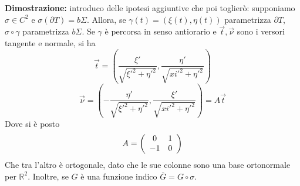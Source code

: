 \documentclass[a4paper,11pt]{article}
\begin{document}
\begin{enumerate}
	\textbf{Dimostrazione:} introduco delle ipotesi aggiuntive che poi toglierò: supponiamo $\sigma\in C^2$ e $\sigma(\partial T)=b\Sigma$. Allora, se $\gamma(t)=(\xi(t),\eta(t))$ parametrizza $\partial T$, $\sigma\circ\gamma$ parametrizza $b\Sigma$. Se $\gamma$ è percorsa in senso antiorario e $\vec{t},\vec\nu$ sono i versori tangente e normale, si ha
	\[\vec{t}=\left(\frac{\xi'}{\sqrt{\xi'^2+\eta'^2}},\frac{\eta'}{\sqrt{xi'^2+\eta'^2}}\right)\]
	\[\vec{\nu}=\left(-\frac{\eta'}{\sqrt{\xi'^2+\eta'^2}},\frac{\xi'}{\sqrt{xi'^2+\eta'^2}}\right)=A\vec{t}\]
	Dove si è posto
	\[A=\left(\begin{array}{c c}
	0 & 1 \\
	-1 & 0 
	\end{array}\right)\]
	Che tra l'altro è ortogonale, dato che le sue colonne sono una base ortonormale per $\mathbb{R}^2$. Inoltre, se $G$ è una funzione indico $\overline{G}=G\circ\sigma$.
	

\end{enumerate}
\end{document}
